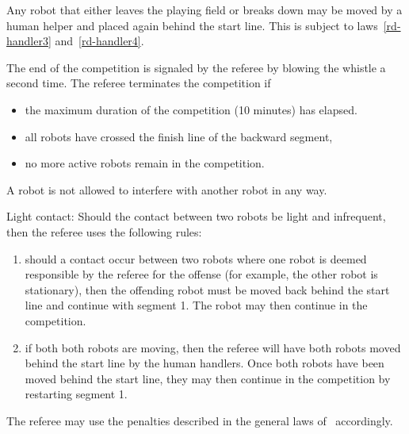 \documentclass[12pt]{hurocup}
\begin{document}
\begin{lawlist}[RD]
\item Any robot that either leaves the playing field or breaks down
  may be moved by a human helper and placed again behind the start
  line. This is subject to laws~\ref{rd-handler3}
  and~\ref{rd-handler4}.

\item The end of the competition is signaled by the referee by blowing
  the whistle a second time. The referee terminates the competition
  if
  \begin{itemize}
  \item the maximum duration of the competition (10 minutes) has
    elapsed.
  \item all robots have crossed the finish line of the backward
    segment,
  \item no more active robots remain in the competition.
  \end{itemize}

\end{lawlist}


\begin{lawlist}[RD]
\item A robot is not allowed to interfere with another robot in any
  way.

\item Light contact: Should the contact between two robots be light
  and infrequent, then the referee uses the following rules:
  \begin{enumerate}

  \item should a contact occur between two robots where one robot is
    deemed responsible by the referee for the offense (for example, the
    other robot is stationary), then the offending robot must be moved
    back behind the start line and continue with segment 1. The robot
    may then continue in the competition.

  \item if both both robots are moving, then the referee will have
    both robots moved behind the start line by the human
    handlers. Once both robots have been moved behind the start line,
    they may then continue in the competition by restarting segment 1.
  \end{enumerate}

\item The referee may use the penalties described in the general laws
of \HuroCup\ accordingly.

\end{lawlist}
\end{document}
